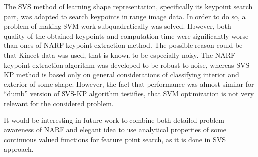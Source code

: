 The SVS method of learning shape representation, specifically its keypoint search part, was adapted to search keypoints in range image data. In order to do so, a problem of making SVM work subquadratically was solved. However, both quality of the obtained keypoints and computation time were significantly worse than ones of NARF keypoint extraction method. The possible reason could be that Kinect data was used, that is known to be especially noisy. The NARF keypoint extraction algorithm was developed to be robust to noise, whereas SVS-KP method is based only on general considerations of classifying interior and exterior of some shape. However, the fact that performance was almost similar for ``dumb'' version of SVS-KP algorithm testifies, that SVM optimization is not very relevant for the considered problem.

It would be interesting in future work to combine both detailed problem awareness of NARF and elegant idea to use analytical properties of some continuous valued functions for feature point search, as it is done in SVS approach.